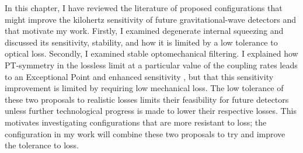 In this chapter, I have reviewed the literature of proposed configurations that might improve the kilohertz sensitivity of future gravitational-wave detectors and that motivate my work.
Firstly, I examined degenerate internal squeezing and discussed its sensitivity, stability, and how it is limited by a low tolerance to optical loss. %
Secondly, I examined stable optomechanical filtering. %
I explained how PT-symmetry in the lossless limit at a particular value of the coupling rates leads to an Exceptional Point and enhanced sensitivity , but that this sensitivity improvement is limited by requiring low mechanical loss.
The low tolerance of these two proposals to realistic losses limits their feasibility for future detectors unless further technological progress is made to lower their respective losses. This motivates investigating configurations that are more resistant to loss; the configuration in my work will combine these two proposals to try and improve the tolerance to loss.


